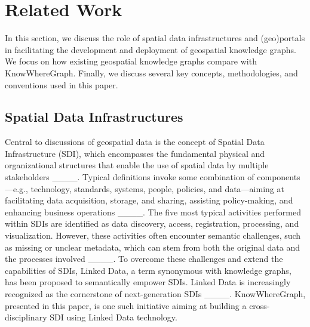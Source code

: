 \section{Related Work}
\label{sec:rel}
In this section, we discuss the role of spatial data infrastructures and (geo)portals in facilitating the development and deployment of geospatial knowledge graphs. We focus on how existing geospatial knowledge graphs compare with KnowWhereGraph. Finally, we discuss several key concepts, methodologies, and conventions used in this paper.  
\subsection{Spatial Data Infrastructures}
\label{ssec:sdi}
Central to discussions of geospatial data is the concept of Spatial Data Infrastructure (SDI), which encompasses the fundamental physical and organizational structures that enable the use of spatial data by multiple stakeholders ____. Typical definitions invoke some combination of components---e.g., technology, standards, systems, people, policies, and data---aiming at facilitating data acquisition, storage, and sharing, assisting policy-making, and enhancing business operations ____. The five most typical activities performed within SDIs are identified as data discovery, access, registration, processing, and visualization. However, these activities often encounter semantic challenges, such as missing or unclear metadata, which can stem from both the original data and the processes involved ____. To overcome these challenges and extend the capabilities of SDIs, Linked Data, a term synonymous with knowledge graphs, has been proposed to semantically empower SDIs. Linked Data is increasingly recognized as the cornerstone of next-generation SDIs ____. KnowWhereGraph, presented in this paper, is one such initiative aiming at building a cross-disciplinary SDI using Linked Data technology. 

